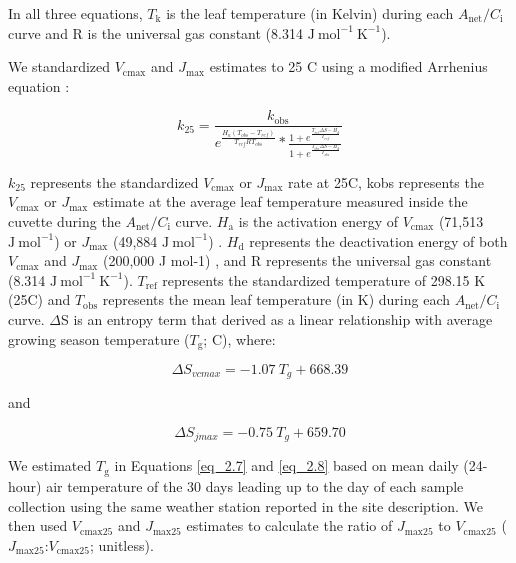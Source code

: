 \noindent In all three equations, $T_\mathrm{k}$ is the leaf temperature (in Kelvin) during each $A_\mathrm{{net}}/C_\mathrm{i}$ curve and R is the universal gas constant (8.314 $\mathrm{J\ mol^{-1}\ K^{-1}}$).

We standardized $V_{\mathrm{cmax}}$ and $J_{\mathrm{max}}$ estimates to 25 \textdegree{}C using a modified Arrhenius equation :

\begin{equation} \label{eq_2.6}
    k_\mathrm{25}=\frac{k_\mathrm{obs}}{e^{\frac{H_a(T_{obs}-T_{ref})}{T_{ref}RT_{obs}}}*\frac{1+e^{\frac{T_{ref}\Delta S-H_d}{T_{ref}}}}{1+e^{\frac{T_{obs}\Delta S-H_d}{T_{obs}}}}}
\end{equation}

$k_\mathrm{25}$ represents the standardized $V_{\mathrm{cmax}}$ or $J_{\mathrm{max}}$ rate at 25\textdegree{}C, kobs represents the $V_{\mathrm{cmax}}$ or $J_{\mathrm{max}}$ estimate at the average leaf temperature measured inside the cuvette during the $A_\mathrm{{net}}/C_\mathrm{i}$ curve. $H_\mathrm{a}$ is the activation energy of $V_{\mathrm{cmax}}$ (71,513 $\mathrm{J\ mol^{-1}}$)  or $J_{\mathrm{max}}$ (49,884 $\mathrm{J\ mol^{-1}}$) . $H_\mathrm{d}$ represents the deactivation energy of both $V_{\mathrm{cmax}}$ and $J_{\mathrm{max}}$ (200,000 J mol-1) , and R represents the universal gas constant (8.314 $\mathrm{J\ mol^{-1}\ K^{-1}}$). $T_\mathrm{ref}$ represents the standardized temperature of 298.15 K (25\textdegree{}C) and $T_\mathrm{obs}$ represents the mean leaf temperature (in K) during each $A_\mathrm{{net}}/C_\mathrm{i}$ curve. $\Delta$S is an entropy term that  derived as a linear relationship with average growing season temperature ($T_\mathrm{g}$; \textdegree{}C), where: 

\begin{equation} \label{eq_2.7}
    \Delta S_{vcmax}=-1.07\ T_{g}+668.39
\end{equation}
    
\noindent and
   
\begin{equation} \label{eq_2.8}
    \Delta S_{jmax}=-0.75\ T_{g}+659.70
\end{equation}

\noindent We estimated $T_\mathrm{g}$ in Equations \ref{eq_2.7} and \ref{eq_2.8} based on mean daily (24-hour) air temperature of the 30 days leading up to the day of each sample collection using the same weather station reported in the site description. We then used $V_{\mathrm{cmax25}}$ and $J_{\mathrm{max25}}$ estimates to calculate the ratio of $J_{\mathrm{max25}}$ to $V_{\mathrm{cmax25}}$ ($J_{\mathrm{max25}}$:$V_{\mathrm{cmax25}}$; unitless).


